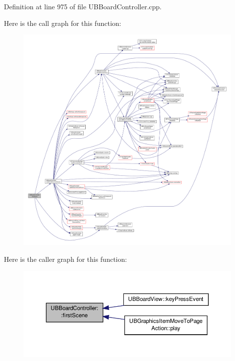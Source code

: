 Definition at line 975 of file U\-B\-Board\-Controller.\-cpp.



Here is the call graph for this function\-:
\nopagebreak
\begin{figure}[H]
\begin{center}
\leavevmode
\includegraphics[width=350pt]{d7/d62/class_u_b_board_controller_a92730653a91693d5d1e6b626a0e0cf4d_cgraph}
\end{center}
\end{figure}




Here is the caller graph for this function\-:
\nopagebreak
\begin{figure}[H]
\begin{center}
\leavevmode
\includegraphics[width=350pt]{d7/d62/class_u_b_board_controller_a92730653a91693d5d1e6b626a0e0cf4d_icgraph}
\end{center}
\end{figure}


